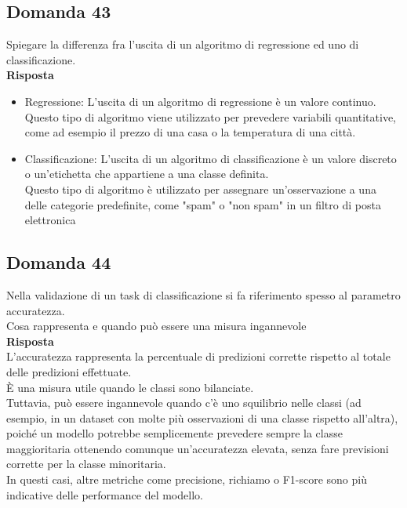 \documentclass[../main.tex]{subfiles}
\begin{document}
	\subsection{Domanda 43}
	Spiegare la differenza fra l’uscita di un algoritmo di regressione ed uno di classificazione.\\
	\textbf{Risposta}
	\begin{itemize}
		\item Regressione: L'uscita di un algoritmo di regressione è un valore continuo. \\
		Questo tipo di algoritmo viene utilizzato per prevedere variabili quantitative, come ad esempio il prezzo di una casa o la temperatura di una città.
		\item Classificazione: L'uscita di un algoritmo di classificazione è un valore discreto o un'etichetta che appartiene a una classe definita. \\
		Questo tipo di algoritmo è utilizzato per assegnare un'osservazione a una delle categorie predefinite, come "spam" o "non spam" in un filtro di posta elettronica
	\end{itemize}
	\subsection{Domanda 44}
	Nella validazione di un task di classificazione si fa riferimento spesso al parametro accuratezza.\\
	Cosa rappresenta e quando può essere una misura ingannevole\\
	\textbf{Risposta}\\
	L'accuratezza rappresenta la percentuale di predizioni corrette rispetto al totale delle predizioni effettuate.\\
	È una misura utile quando le classi sono bilanciate.\\
	Tuttavia, può essere ingannevole quando c'è uno squilibrio nelle classi (ad esempio, in un dataset con molte più osservazioni di una classe rispetto all'altra), poiché un modello potrebbe semplicemente prevedere sempre la classe maggioritaria ottenendo comunque un'accuratezza elevata, senza fare previsioni corrette per la classe minoritaria.\\
	In questi casi, altre metriche come precisione, richiamo o F1-score sono più indicative delle performance del modello.
\end{document}
